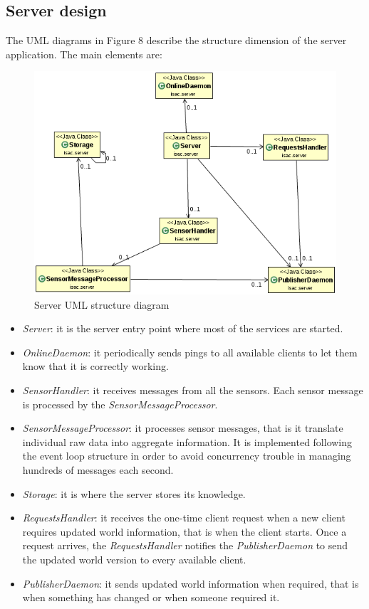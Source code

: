 \documentclass[11pt]{article}
\begin{document}
\subsection{Server design}
The UML diagrams in Figure 8 describe the structure dimension of the server application. The main elements are:
\begin{figure}
  \centering
	\includegraphics[scale=0.8]{serverUML}
  \caption{Server UML structure diagram}
\end{figure}
\begin{itemize}
\item \emph{Server}: it is the server entry point where most of the services are started.
\item \emph{OnlineDaemon}: it periodically sends pings to all available clients to let them know that it is correctly working.
\item \emph{SensorHandler}: it receives messages from all the sensors. Each sensor message is processed by the \emph{SensorMessageProcessor}.
\item \emph{SensorMessageProcessor}: it processes sensor messages, that is it translate individual raw data into aggregate information. It is implemented following the event loop structure in order to avoid concurrency trouble in managing hundreds of messages each second.
\item \emph{Storage}: it is where the server stores its knowledge.
\item \emph{RequestsHandler}: it receives the one-time client request when a new client requires updated world information, that is when the client starts. Once a request arrives, the \emph{RequestsHandler} notifies the \emph{PublisherDaemon} to send the updated world version to every available client.
\item \emph{PublisherDaemon}: it sends updated world information when required, that is when something has changed or when someone required it.
\end{itemize}
\end{document}
